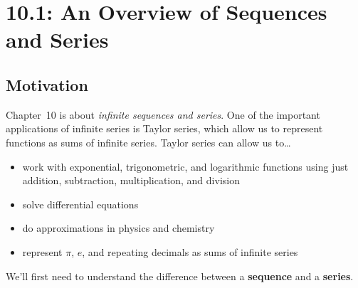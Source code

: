 \documentclass[12pt]{article}
\begin{document}
\section*{10.1: An Overview of Sequences and Series}


\vspace{5mm}

\subsection*{Motivation} Chapter~10 is about \textit{infinite sequences and series}. One of the important applications of infinite series is Taylor series, which allow us to represent functions as sums of infinite series. Taylor series can allow us to\dots
\begin{itemize}
	\item work with exponential, trigonometric, and logarithmic functions using just addition, subtraction, multiplication, and division
	\item solve differential equations
	\item do approximations in physics and chemistry
	\item represent $\pi$, $e$, and repeating decimals as sums of infinite series
\end{itemize}

\vspace{2mm}

We'll first need to understand the difference between a \textbf{sequence} and a \textbf{series}.\\
\end{document}
